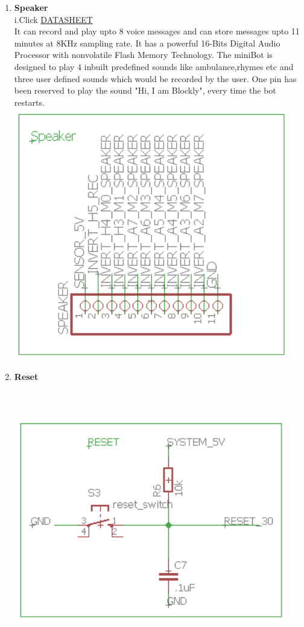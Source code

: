 \documentclass[a4paper,12pt,oneside]{book}
\begin{document}
\begin{enumerate}
    \newpage\item \textbf{Speaker}\\
    i.Click \href{https://img.ozdisan.com/ETicaret_Dosya/358195_3955320.pdf}{DATASHEET}
    \\[0.5cm]It can record and play upto 8 voice messages and can store messages upto 11 minutes at 8KHz sampling rate.
    It has a powerful 16-Bits Digital Audio Processor with nonvolatile Flash Memory Technology.
    The miniBot is designed to play 4 inbuilt predefined sounds like ambulance,rhymes etc and three user defined sounds which would be recorded by the user. One pin has been reserved to play the sound "Hi, I am Blockly", every time the bot restarts.
    \vspace*{1cm}
    \\\hspace*{.4cm}\includegraphics[width=12cm, height=11cm]{Speaker}
    
    \newpage\item \textbf{Reset}\\
    \\\hfill\includegraphics[width=12cm, height=11cm]{RESET}
    

\end{enumerate}
\end{document}
